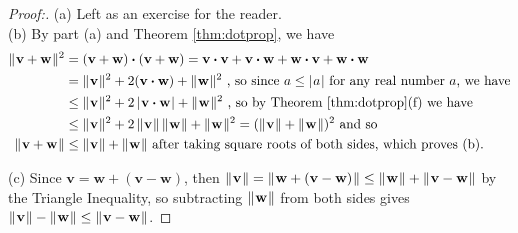 \begin{proofbar}\vspace{-3mm}\begin{proof}[Proof:]
 (a) Left as an exercise for the reader.\vspace{1mm}\\(b) By part (a) and Theorem \ref{thm:dotprop}, we have
  \begin{align*}
   \lVert\mspace{1mu}\textbf{v} + \textbf{w}\mspace{1mu}\rVert^2 &= (\textbf{v} + \textbf{w}) \bm{\cdot} (\textbf{v} + \textbf{w})
   = \textbf{v} \bm{\cdot} \textbf{v} + \textbf{v} \bm{\cdot} \textbf{w} + \textbf{w} \bm{\cdot} \textbf{v} +
   \textbf{w} \bm{\cdot} \textbf{w}\\
   &= \lVert\mspace{1mu}\textbf{v}\mspace{1mu}\rVert^2 + 2(\textbf{v} \bm{\cdot} \textbf{w}) + \lVert\mspace{1mu}\textbf{w}\mspace{1mu}\rVert^2 \text{~, so since $a \le \lvert\mspace{1mu}a\mspace{1mu}\rvert$
    for any real number $a$, we have}\\
   &\le \lVert\mspace{1mu}\textbf{v}\mspace{1mu}\rVert^2 + 2\,\lvert\mspace{1mu}\textbf{v} \bm{\cdot} \textbf{w}\mspace{1mu}\rvert + \lVert\mspace{1mu}\textbf{w}\mspace{1mu}\rVert^2 
    \text{~, so by Theorem \ref{thm:dotprop}(f) we have}\\
   &\le \lVert\mspace{1mu}\textbf{v}\mspace{1mu}\rVert^2 + 2\,\lVert\mspace{1mu}\textbf{v}\mspace{1mu}\rVert\,\lVert\mspace{1mu}\textbf{w}\mspace{1mu}\rVert + \lVert\mspace{1mu}\textbf{w}\mspace{1mu}\rVert^2 =
    (\lVert\mspace{1mu}\textbf{v}\mspace{1mu}\rVert + \lVert\mspace{1mu}\textbf{w}\mspace{1mu}\rVert)^2 \text{~and so}\\
   \lVert\mspace{1mu}\textbf{v} + \textbf{w}\mspace{1mu}\rVert &\le \lVert\mspace{1mu}\textbf{v}\mspace{1mu}\rVert + \lVert\mspace{1mu}\textbf{w}\mspace{1mu}\rVert
    \text{~after taking square roots of both sides, which proves (b).}
  \end{align*}
  \par\noindent(c) Since $\textbf{v} = \textbf{w} + (\textbf{v} - \textbf{w})$, then $\lVert\mspace{1mu}\textbf{v}\mspace{1mu}\rVert = 
  \lVert\mspace{1mu}\textbf{w} + (\textbf{v} - \textbf{w})\mspace{1mu}\rVert \le \lVert\mspace{1mu}\textbf{w}\mspace{1mu}\rVert + \lVert\mspace{1mu}\textbf{v} - \textbf{w}\mspace{1mu}\rVert$
  by the Triangle Inequality, so subtracting $\lVert\mspace{1mu}\textbf{w}\mspace{1mu}\rVert$ from both sides gives
  $\lVert\mspace{1mu}\textbf{v}\mspace{1mu}\rVert - \lVert\mspace{1mu}\textbf{w}\mspace{1mu}\rVert \le \lVert\mspace{1mu}\textbf{v} - \textbf{w}\mspace{1mu}\rVert$. \qquad \qedhere \vspace{-3mm}
\end{proof}\end{proofbar}

